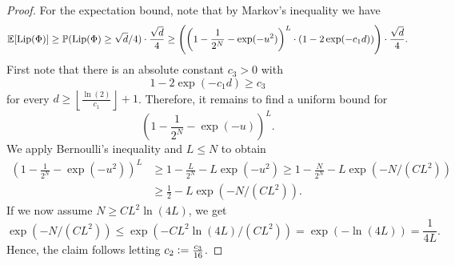 \begin{proof}
For the expectation bound, note that by Markov's inequality we have
\begin{equation*}
\mathbb{E}[\operatorname{Lip}(\Phi)] \geq \mathbb{P}(\operatorname{Lip}(\Phi) \geq \sqrt{d}/4) \cdot \frac{\sqrt{d}}{4} \geq \left(\left(1-\frac{1}{2^N}-\exp(-u^2)\right)^L\cdot (1-2\exp(-c_1d))\right)\cdot \frac{\sqrt{d}}{4}.
\end{equation*}
First note that there is an absolute constant $c_3>0$ with 
\begin{equation*}
1-2\exp(-c_1d) \geq c_3
\end{equation*}
for every $d \geq \left\lfloor \frac{\ln(2)}{c_1}\right\rfloor + 1$. Therefore, it remains to find a uniform bound for 
\begin{equation*}
\left(1-\frac{1}{2^N}-\exp(-u)\right)^L.
\end{equation*}
We apply Bernoulli's inequality and $L \leq N$ to obtain
\begin{align*}
\left(1-\frac{1}{2^N}-\exp(-u^2)\right)^L &\geq 1 - \frac{L}{2^N} - L\exp(-u^2)\geq 1 - \frac{N}{2^N} - L\exp \left(-N/(CL^2)\right) \\
& \geq\frac{1}{2} - L\exp(-N/(CL^2)).
\end{align*}
If we now assume $N \geq CL^2 \ln(4L)$, we get
\begin{equation*}
\exp(-N/(CL^2)) \leq \exp(-CL^2\ln(4L)/(CL^2)) = \exp(- \ln(4L)) = \frac{1}{4L}.
\end{equation*}
Hence, the claim follows letting $c_2 \mathrel{\mathop:}= \frac{c_3}{16}$.
\end{proof}
\renewcommand*{\proofname}{Proof}
